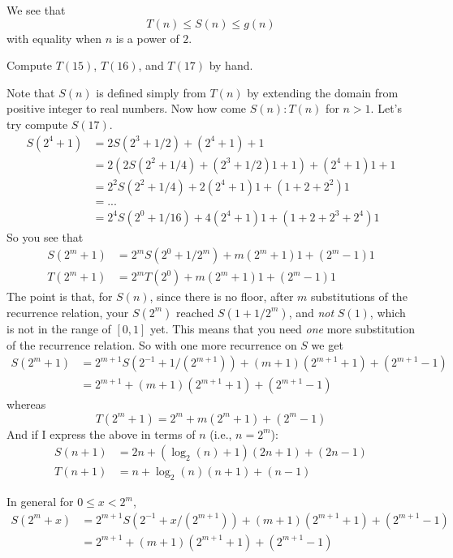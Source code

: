 We see that 
\[
T(n) \leq S(n) \leq g(n)
\]
with equality when $n$ is a power of $2$.



\begin{ex}
Compute $T(15)$, $T(16)$, and $T(17)$ by hand.
\end{ex}

Note that $S(n)$ is defined simply from $T(n)$
by extending the domain from positive integer to real numbers.
Now how come $S(n) : T(n)$ for $n > 1$.
Let's try compute $S(17)$.
\begin{align*}
S(2^4 + 1) 
&= 2S(2^3 + 1/2) + (2^4 + 1) + 1 \\
&= 2(2S(2^2 + 1/4) + (2^3 + 1/2)1 + 1) + (2^4 + 1)1 + 1 \\
&= 2^2 S(2^2 + 1/4) + 2(2^4 + 1)1 + (1 + 2 + 2^2)1 \\
&= ... \\
&= 2^4 S(2^0 + 1/16) + 4(2^4 + 1)1 + (1 + 2 + 2^3 + 2^4)1
\end{align*}
So you see that 
\begin{align*}
S(2^m + 1) &= 2^m S(2^0 + 1/2^m) + m(2^m + 1)1 + (2^m - 1)1 \\
T(2^m + 1) &= 2^m T(2^0) + m(2^m + 1)1 + (2^m - 1)1 
\end{align*}
The point is that, for $S(n)$, since there is no floor,
after $m$ substitutions of the recurrence relation,
your $S(2^m)$ reached $S(1 + 1/2^m)$, and {\it not} $S(1)$, 
which is not in the range 
of $[0, 1]$ yet.
This means that you need {\it one} more substitution of the 
recurrence relation.
So with one more recurrence on $S$ we get
\begin{align*}
S(2^m + 1) 
&= 2^{m+1} S(2^{-1} + 1/(2^{m+1})) + (m+1)(2^{m+1} + 1) + (2^{m+1} - 1) \\
&= 2^{m+1} + (m+1)(2^{m+1} + 1) + (2^{m+1} - 1)
\end{align*}
whereas
\[
T(2^m + 1) = 2^m  + m(2^m + 1) + (2^m - 1) 
\]
And if I express the above in terms of $n$ (i.e., $n = 2^m$):
\begin{align*}
S(n + 1) 
&= 2n + (\log_2(n)+1)(2n + 1) + (2n - 1) \\
T(n + 1) &= n  + \log_2(n) (n + 1) + (n - 1) 
\end{align*}

In general for $0 \leq x < 2^m$,
\begin{align*}
S(2^m + x) 
&= 2^{m+1} S(2^{-1} + x/(2^{m+1})) + (m+1)(2^{m+1} + 1) + (2^{m+1} - 1) \\
&= 2^{m+1} + (m+1)(2^{m+1} + 1) + (2^{m+1} - 1) 
\end{align*}


